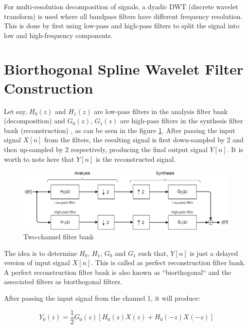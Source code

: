 For multi-resolution decomposition of signals, a dyadic DWT (discrete wavelet transform) is used where all bandpass filters have different frequency resolution. This is done by first using low-pass and high-pass filters to split the signal into low and high-frequency components.

\section{Biorthogonal Spline Wavelet Filter Construction}
Let say, ${H_{0}(z)}$ and ${H_{1}(z)}$ are low-pass filters in the analysis filter bank (decomposition) and ${G_{0}(z)}$, ${G_{1}(z)}$ are high-pass filters in the synthesis filter bank (reconstruction) \cite{wang2001using}, as can be seen in the figure \ref{fig:2_channel_filter_bank}. After passing the input signal $X[n]$ from the filters, the resulting signal is first down-sampled by 2 and then up-sampled by 2  respectively, producing the final output signal $Y[n]$. It is worth to note here that $Y[n]$ is the reconstructed signal. 



\begin{figure}
	\centering
	\includegraphics[width=160mm]{images/2_channel_filter_bank}
	\caption{Two-channel filter bank}
	\label{fig:2_channel_filter_bank}
\end{figure}



The idea is to determine $H_0$, $H_1$, $G_0$ and $G_1$ such that, $Y[n]$ is just a delayed version of input signal $X[n]$. This is called as perfect reconstruction filter bank. A perfect reconstruction filter bank is also known as ``biorthogonal`` and the associated filters as biorthogonal filters. 

After passing the input signal from the channel 1, it will produce:

\begin{equation} \label{eqn_wavelet_transform}
{Y_{0}(z) = \frac{1}{2}G_{0}(z)[H_{0}(z)X(z) + H_{0}(-z)X(-z)]}
\end{equation}


